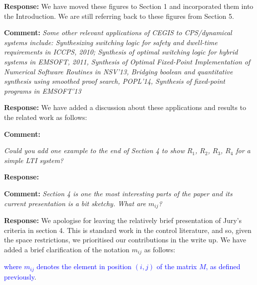 \documentclass{article}
\newcommand{\rev}[1]{\textcolor{blue}{#1}}
\begin{document}
\vspace{1em}
{\bf Response: }
We have moved these figures to Section 1 and incorporated them into the Introduction. We are still referring back to these figures from Section 5.

\vspace{2em}

{\bf Comment: } {\itshape
Some other relevant applications of CEGIS to CPS/dynamical systems include: Synthesizing switching logic for
safety and dwell-time requirements in ICCPS, 2010; Synthesis of optimal switching logic for hybrid systems in EMSOFT, 2011, Synthesis of Optimal
Fixed-Point Implementation of Numerical Software Routines in NSV'13, Bridging boolean and quantitative synthesis using smoothed proof search,
POPL'14, Synthesis of fixed-point programs in EMSOFT'13}

\vspace{1em}
{\bf Response: }
We have added a discussion about these applications and results to the related work as follows:

\vspace{2em}
{\bf Comment: } {\itshape 
Could you add one example to the end of Section 4 to show $R_1$, $R_2$, $R_3$, $R_4$ for a simple LTI system? 

\vspace{1em}
{\bf Response: }



\vspace{2em}
{\bf Comment: } {\itshape 
Section 4 is one the most interesting parts
of the paper and its current presentation is a bit sketchy. What are $m_{ij}$?} } 

\vspace{1em}
{\bf Response: }
We apologise for leaving the relatively brief presentation of Jury's criteria in section 4. This is standard
work in the control literature, and so, given the space restrictions, we prioritised our contributions in the write up. 
We have added a brief clarification of the notation $m_{ij}$ as follows:

\rev{where $m_{ij}$ denotes the element in position $(i,j)$ of the matrix $M$, as defined previously}.




\end{document}

